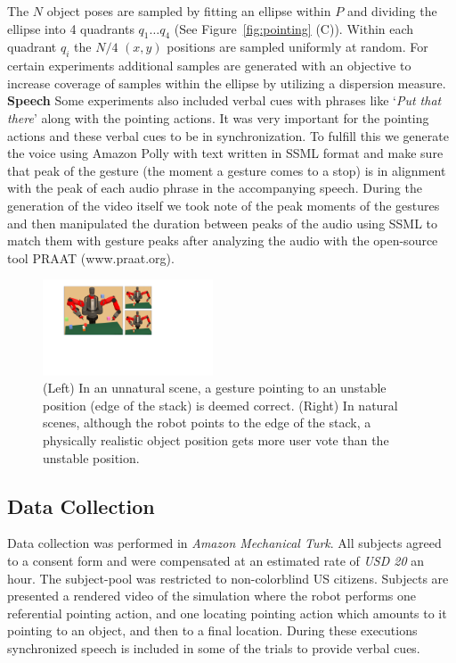 \documentclass[letterpaper]{article} %
\begin{document}
The $N$ object poses are sampled by fitting an ellipse within $P$ and dividing the ellipse into 4 quadrants $q_1\ldots q_4$ (See Figure~\ref{fig:pointing} (C)). Within each quadrant $q_i$ the $N/4$ $(x,y)$ positions are sampled uniformly at random. For certain experiments additional samples are generated with an objective to increase coverage of samples within the ellipse by utilizing a dispersion measure.\\

\noindent\textbf{Speech} Some experiments also included verbal cues with phrases like `\textit{Put that there}' along with the pointing actions. It was very important for the pointing actions and these verbal cues to be in synchronization. To fulfill this we generate the voice using Amazon Polly with text written in SSML format and make sure that peak of the gesture (the moment a gesture comes to a stop) is in alignment with the peak of each audio phrase in the accompanying speech. During the generation of the video itself we took note of the peak moments of the gestures and then manipulated the duration between peaks of the audio using SSML to match them with gesture peaks after analyzing the audio with the open-source tool PRAAT (www.praat.org).



\begin{figure}[t]
    \centering
    \includegraphics[width=0.45\textwidth]{natural.pdf}
    \caption{(Left) In an unnatural scene, a gesture pointing to an unstable position (edge of the stack) is deemed correct. (Right) In natural scenes, although the robot points to the edge of the stack, a physically realistic object position gets more user vote than the unstable position.}
    \label{fig:natural}
\end{figure}

\subsection{Data Collection}

Data collection was performed in \textit{Amazon Mechanical Turk}. All subjects agreed to a consent form and were compensated at an estimated rate of \textit{USD 20} an hour. The subject-pool was restricted to non-colorblind US citizens. Subjects are presented a rendered video of the simulation where the robot performs one referential pointing action, and one locating pointing action which amounts to it pointing to an object, and then to a final location. During these executions synchronized speech is included in some of the trials to provide verbal cues.
\end{document}
